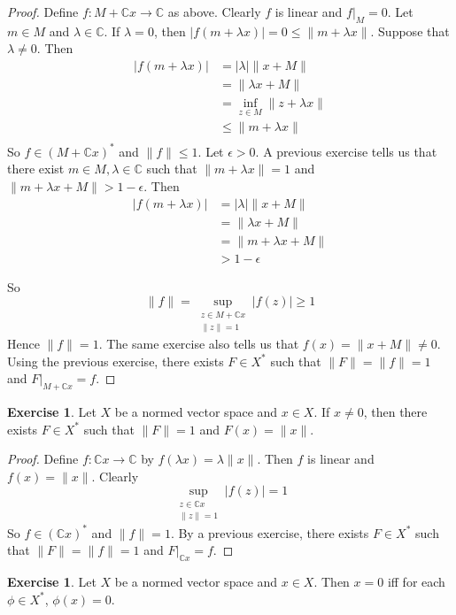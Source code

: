 \documentclass[12pt]{amsart}
\theoremstyle{definition}
\newtheorem{ex}[definition]{Exercise}
\newcommand{\lam}{\lambda}
\newcommand{\ep}{\epsilon}
\newcommand{\C}{\mathbb{C}}
\DeclareMathOperator*{\0}{\mbf{0}}
\DeclareMathOperator*{\1}{\mbf{1}}
\newcommand{\lex}[1]{\label{ex:#1}}
\begin{document}
	\begin{proof}
		Define $f:M+\C x \rightarrow \C$ as above. Clearly $f$ is linear and $f|_M = 0$. Let $m \in M$ and $\lam \in \C$. If $\lam = 0$, then $\vert f(m +\lam x) \vert = 0 \leq \|m+ \lam x \|$. Suppose that $\lam \neq 0$. Then 
		\begin{align*}
			\vert f(m+\lam x) \vert 
			& = \vert \lam \vert \|x+M \|\\
			& =  \|\lam x+M \|\\
			& = \inf_{z \in M} \|z+ \lam x \|\\
			& \leq  \|m+ \lam x  \|\\
		\end{align*} 
		So $f \in (M+\C x )^*$ and $\|f \|\leq 1$. Let $\ep >0$. A previous exercise tells us that there exist $m \in M, \lam \in \C$ such that $\|m+ \lam x \|= 1$ and $\|m+ \lam x +M \|> 1- \ep$. Then 
		\begin{align*}
			\vert f(m + \lam x) \vert
			&= \vert \lam \vert \|x+M\|\\
			&=\|\lam x +M \|\\
			&= \|m + \lam x +M \|\\
			&> 1-\ep
		\end{align*}
		
		So $$ \|f \|= \sup_{\substack{z \in M + \C x \\ \|z \|=1}} \vert f(z) \vert \geq 1$$ Hence $\|f \|=1$. 
		The same exercise also tells us that $f(x) = \|x+M\|\neq 0$. Using the previous exercise, there exists $F \in X^*$ such that $\|F \|= \|f \|= 1$ and $F|_{M+\C x} = f$.
	\end{proof}
	
	\begin{ex} \lex{55018}
		Let $X$ be a normed vector space and $x \in X$. If $x \neq 0$, then there exists $F \in X^*$ such that $\|F \|= 1$ and $F(x) = \|x \|$.
	\end{ex}
	
	\begin{proof}
		Define $f:\C x \rightarrow \C$ by $f(\lam x) = \lam \|x \|$. Then $f$ is linear and $f(x) = \|x \|$. Clearly $$\sup_{\substack{z \in \C x \\ \|z \|=1}}\vert f(z) \vert = 1$$ 
		So $f \in (\C x)^*$ and $\|f \|= 1$. By a previous exercise, there exists $F \in X^*$ such that $\|F \|= \|f \|=1$ and $F|_{\C x} = f$. 
	\end{proof}
	
	\begin{ex} \lex{55019}
	Let $X$ be a normed vector space and $x \in X$. Then $x = 0$ iff for each $\phi \in X^*$, $\phi(x) = 0$.
	\end{ex}
	
\end{document}
